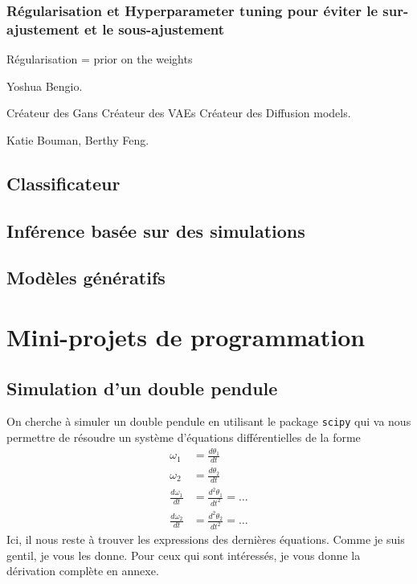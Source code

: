 \documentclass[titlepage]{article}
\theoremstyle{cleanremark}
\begin{document}
\subsubsection{Régularisation et Hyperparameter tuning pour éviter le sur-ajustement et le sous-ajustement}

Régularisation = prior on the weights


Yoshua Bengio. 


Créateur des Gans
Créateur des VAEs
Créateur des Diffusion models. 

Katie Bouman, Berthy Feng. 

\subsection{Classificateur}

\subsection{Inférence basée sur des simulations}

\subsection{Modèles génératifs}


\section{Mini-projets de programmation}\label{sec:mini_projects}
\subsection{Simulation d'un double pendule}
On cherche à simuler un double pendule en utilisant le package \texttt{scipy} qui va nous permettre de résoudre un système d'équations différentielles de la forme
\begin{align}
    \omega_1 &= \frac{d\theta_1}{dt}
    \\
    \omega_2&= \frac{d\theta_2}{dt}
    \\
    \frac{d\omega_1}{dt} &=\frac{d^2\theta_1}{dt^2} = \dots
    \\
    \frac{d \omega_2}{dt}&=\frac{d^2\theta_2}{dt^2}=\dots
\end{align}
Ici, il nous reste à trouver les expressions des dernières équations. Comme je suis gentil, je vous les donne. Pour ceux qui sont intéressés, je vous donne la dérivation complète en annexe.
\end{document}
